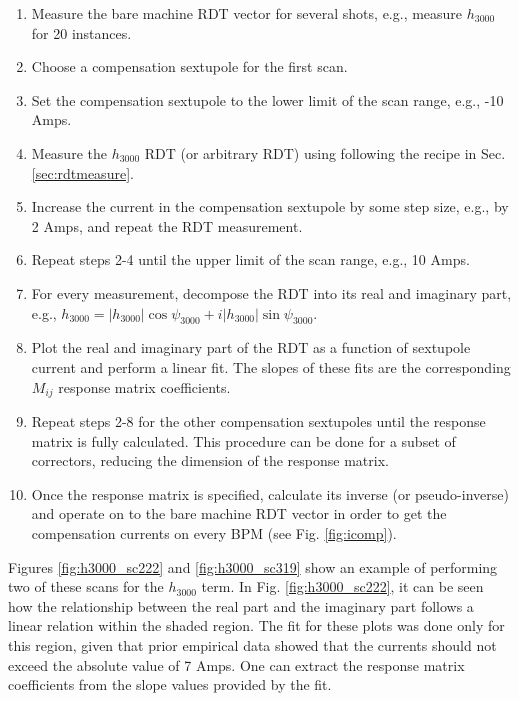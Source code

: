 \begin{enumerate}
    \item Measure the bare machine RDT vector for several shots, e.g., measure $h_{3000}$ for 20 instances.
    \item Choose a compensation sextupole for the first scan.
    \item Set the compensation sextupole to the lower limit of the scan range, e.g., -10 Amps.
    \item Measure the $h_{3000}$ RDT (or arbitrary RDT) using following the recipe in Sec. \ref{sec:rdtmeasure}.
    \item Increase the current in the compensation sextupole by some step size, e.g., by 2 Amps, and repeat the RDT measurement.
    \item Repeat steps 2-4 until the upper limit of the scan range, e.g., 10 Amps.
    \item For every measurement, decompose the RDT into its real and imaginary part, e.g., $h_{3000}= |h_{3000}| \cos \psi_{3000} + i |h_{3000}| \sin \psi_{3000}$. 
    \item Plot the real and imaginary part of the RDT as a function of sextupole current and perform a linear fit. The slopes of these fits are the corresponding $M_{ij}$ response matrix coefficients.
    \item Repeat steps 2-8 for the other compensation sextupoles until the response matrix is fully calculated. This procedure can be done for a subset of correctors, reducing the dimension of the response matrix. 
    \item Once the response matrix is specified, calculate its inverse (or pseudo-inverse) and operate on to the bare machine RDT vector in order to get the compensation currents on every BPM (see Fig. \ref{fig:icomp}).
\end{enumerate}

Figures \ref{fig:h3000_sc222} and \ref{fig:h3000_sc319} show an example of performing two of these scans for the $h_{3000}$ term. In Fig. \ref{fig:h3000_sc222}, it can be seen how the relationship between the real part and the imaginary part follows a linear relation within the shaded region. The fit for these plots was done only for this region, given that prior empirical data showed that the currents should not exceed the absolute value of 7 Amps. One can extract the response matrix coefficients from the slope values provided by the fit.  

